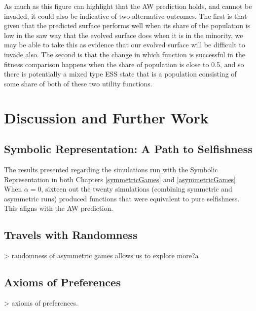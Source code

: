 \documentclass[11pt]{book}
\newcommand*{\np}{\par\noindent\newline}
\begin{document}
\np As much as this figure can highlight that the AW prediction holds, and cannot be invaded, it could also be indicative of two alternative outcomes.
The first is that given that the predicted surface performs well when its share of the population is low in the saw way that the evolved surface does when it is in the minority,
we may be able to take this as evidence that our evolved surface will be difficult to invade also.
The second is that the change in which function is successful in the fitness comparison happens when the share of population is close to 0.5,
and so there is potentially a mixed type ESS state that is a population consisting of some share of both of these two utility functions.

\section{Discussion and Further Work}

\subsection{Symbolic Representation: A Path to Selfishness}
The results presented regarding the simulations run with the Symbolic Representation in both Chapters \ref{symmetricGames} and \ref{asymmetricGames} 
When $\alpha = 0$, sixteen out the twenty simulations (combining symmetric and asymmetric runs) produced functions that were equivalent to pure selfishness.
This aligns with the AW prediction. 

\subsection{Travels with Randomness}
> randomness of asymmetric games allows us to explore more?a


\subsection{Axioms of Preferences}

> axioms of preferences.




\end{document}
